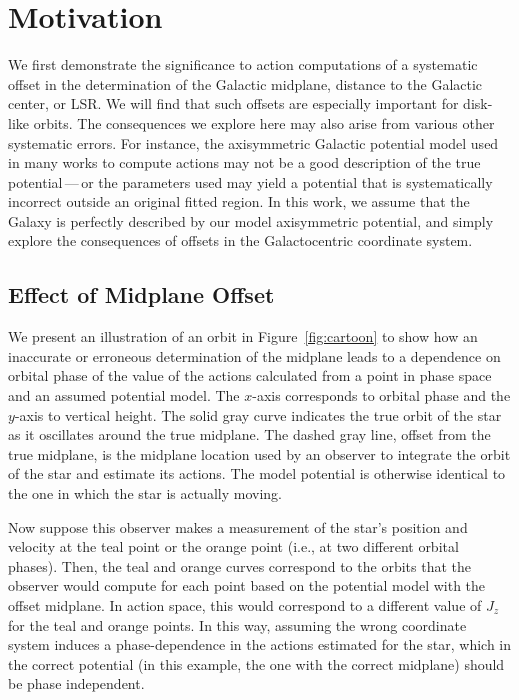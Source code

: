 \documentclass[twocolumn]{aastex62}
\begin{document}
\section{Motivation} \label{sec:ref_frame}
We first demonstrate the significance to action computations of a systematic
offset in the determination of the Galactic midplane, distance to the Galactic
center, or LSR. We will find that such offsets are especially important for
disk-like orbits. The consequences we explore here may also arise from various
other systematic errors. For instance, the axisymmetric Galactic potential
model used in many works to compute actions may not be a good description of
the true potential\,---\,or the parameters used may yield a potential that is
systematically incorrect outside an original fitted region. In this work, we
assume that the Galaxy is perfectly described by our model axisymmetric
potential, and simply explore the consequences of offsets in the
Galactocentric coordinate system.

\subsection{Effect of Midplane Offset} \label{ssec:cartoon}
We present an illustration of an orbit in Figure~\ref{fig:cartoon} to show how
an inaccurate or erroneous determination of the midplane leads to a dependence
on orbital phase of the value of the actions calculated from a point in phase
space and an assumed potential model. The $x$-axis corresponds to orbital
phase and the $y$-axis to vertical height. The solid gray curve indicates the
true orbit of the star as it oscillates around the true midplane. The dashed
gray line, offset from the true midplane, is the midplane location used by an
observer to integrate the orbit of the star and estimate its actions. The
model potential is otherwise identical to the one in which the star is
actually moving.

Now suppose this observer makes a measurement of the star's position and
velocity at the teal point or the orange point (i.e., at two different orbital
phases). Then, the teal and orange curves correspond to the orbits that the
observer would compute for each point based on the potential model with the
offset midplane. In action space, this would correspond to a different value
of $J_z$ for the teal and orange points. In this way, assuming the wrong
coordinate system induces a phase-dependence in the actions estimated for the
star, which in the correct potential (in this example, the one with the
correct midplane) should be phase independent.
\end{document}
